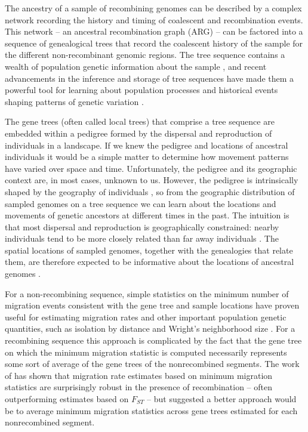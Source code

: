 The ancestry of a sample of recombining genomes can be described by a complex
network recording the history and timing of coalescent and recombination
events. This network -- an ancestral recombination graph (ARG) -- can be
factored into a sequence of genealogical trees that record the coalescent 
history of the sample for the different non-recombinant genomic regions. The
tree sequence contains a wealth of population genetic information about the sample 
\citep{Ralph_etal_2020}, and recent advancements in the inference and storage 
of tree sequences have made them a powerful tool for learning about population 
processes and historical events shaping patterns of genetic variation
\citep{Anderson-Trocme_etal_2023, Kelleher_etal_2016, Kelleher_etal_2019,
Lewanski_etal_2023, Wong_etal_2023}.

The gene trees (often called local trees) that comprise a tree sequence are
embedded within a pedigree formed by the dispersal and reproduction of
individuals in a landscape. If we knew the pedigree and locations of ancestral 
individuals it would be a simple matter to determine how movement patterns have
varied over space and time. Unfortunately, the pedigree and its geographic
context are, in most cases, unknown to us. However, the pedigree is
intrinsically shaped by the geography of individuals \citep{Bradburd_Ralph_2019},
so from the geographic distribution of sampled genomes on a tree sequence we
can learn about the locations and movements of genetic ancestors at different
times in the past. The intuition is that most dispersal and reproduction is
geographically constrained: nearby individuals tend to be more closely related
than far away individuals \citep{Wright_1943}.  The spatial locations of sampled
genomes, together with the genealogies that relate them, are therefore expected
to be informative about the locations of ancestral genomes
\citep{Wakeley_1999, Wilkins_2004}.

For a non-recombining sequence, simple statistics on the minimum number of
migration events consistent with the gene tree and sample locations have
proven useful for estimating migration rates and other important population
genetic quantities, such as isolation by distance and Wright's neighborhood
size \citep{Slatkin_Maddison_1989, Slatkin_Maddison_1990}. For a recombining
sequence this approach is complicated by the fact that the gene tree on which
the minimum migration statistic is computed necessarily represents some sort of
average of the gene trees of the nonrecombined segments. The work of 
\citet{Hudson_etal_1992} has shown that migration rate estimates based on
minimum migration statistics are surprisingly robust in the presence of
recombination -- often outperforming estimates based on $F_{ST}$ -- but 
suggested a better approach would be to average minimum migration 
statistics across gene trees estimated for each nonrecombined segment.

